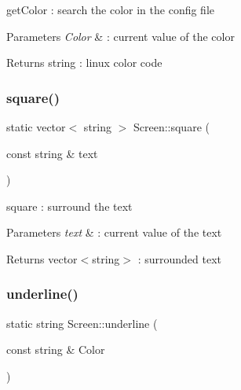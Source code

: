 get\+Color \+: search the color in the config file 


\begin{DoxyParams}{Parameters}
{\em Color} & \+: current value of the color \\
\hline
\end{DoxyParams}
\begin{DoxyReturn}{Returns}
string \+: linux color code 
\end{DoxyReturn}
\mbox{\label{class_screen_acfa6f40ddcae5ffd314f5c62e805f042}} 
\subsubsection{\texorpdfstring{square()}{square()}}
{\footnotesize\ttfamily static vector$<$ string $>$ Screen\+::square (\begin{DoxyParamCaption}\item[{const string \&}]{text }\end{DoxyParamCaption})\hspace{0.3cm}{\ttfamily [static]}}



square \+: surround the text 


\begin{DoxyParams}{Parameters}
{\em text} & \+: current value of the text \\
\hline
\end{DoxyParams}
\begin{DoxyReturn}{Returns}
vector$<$string$>$ \+: surrounded text 
\end{DoxyReturn}
\mbox{\label{class_screen_a60872d6d9e17da898f53889f6cb2e291}} 
\subsubsection{\texorpdfstring{underline()}{underline()}}
{\footnotesize\ttfamily static string Screen\+::underline (\begin{DoxyParamCaption}\item[{const string \&}]{Color }\end{DoxyParamCaption})\hspace{0.3cm}{\ttfamily [static]}}



